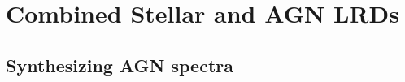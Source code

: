\section{Combined Stellar and AGN LRDs}
\label{sec:combined}

\subsection{Synthesizing AGN spectra}
\label{sec:stellar_fm}